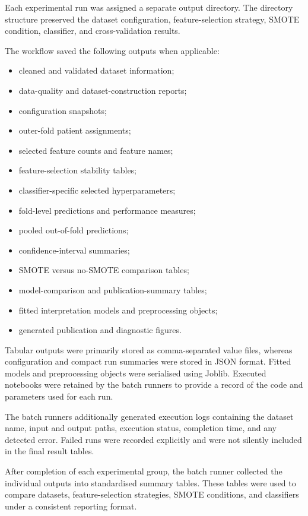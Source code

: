 \documentclass[12pt,twocolumn]{article}
\begin{document}
Each experimental run was assigned a separate output directory. The
directory structure preserved the dataset configuration,
feature-selection strategy, SMOTE condition, classifier, and
cross-validation results.

The workflow saved the following outputs when applicable:

\begin{itemize}
    \item cleaned and validated dataset information;
    \item data-quality and dataset-construction reports;
    \item configuration snapshots;
    \item outer-fold patient assignments;
    \item selected feature counts and feature names;
    \item feature-selection stability tables;
    \item classifier-specific selected hyperparameters;
    \item fold-level predictions and performance measures;
    \item pooled out-of-fold predictions;
    \item confidence-interval summaries;
    \item SMOTE versus no-SMOTE comparison tables;
    \item model-comparison and publication-summary tables;
    \item fitted interpretation models and preprocessing objects;
    \item generated publication and diagnostic figures.
\end{itemize}

Tabular outputs were primarily stored as comma-separated value files,
whereas configuration and compact run summaries were stored in JSON
format. Fitted models and preprocessing objects were serialised using
Joblib. Executed notebooks were retained by the batch runners to
provide a record of the code and parameters used for each run.

The batch runners additionally generated execution logs containing the
dataset name, input and output paths, execution status, completion
time, and any detected error. Failed runs were recorded explicitly and
were not silently included in the final result tables.

After completion of each experimental group, the batch runner collected
the individual outputs into standardised summary tables. These tables
were used to compare datasets, feature-selection strategies, SMOTE
conditions, and classifiers under a consistent reporting format.
\end{document}
